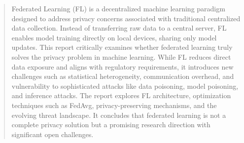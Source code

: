 \begin{abstract}
Federated Learning (FL) is a decentralized machine learning paradigm designed to address privacy concerns associated with traditional centralized data collection. Instead of transferring raw data to a central server, FL enables model training directly on local devices, sharing only model updates. This report critically examines whether federated learning truly solves the privacy problem in machine learning. While FL reduces direct data exposure and aligns with regulatory requirements, it introduces new challenges such as statistical heterogeneity, communication overhead, and vulnerability to sophisticated attacks like data poisoning, model poisoning, and inference attacks. The report explores FL architecture, optimization techniques such as FedAvg, privacy-preserving mechanisms, and the evolving threat landscape. It concludes that federated learning is not a complete privacy solution but a promising research direction with significant open challenges.
\end{abstract}
